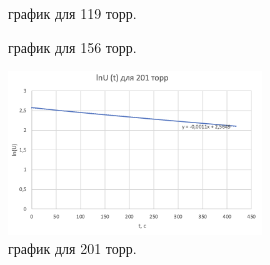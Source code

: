 \documentclass[a4paper,12pt]{article}
\begin{document}
    \begin{figure}[h]
        \begin{minipage}[h]{0.49\linewidth}
        \caption{график для 119 торр.}
        \end{minipage}
        \hfill
        \begin{minipage}[h]{0.49\linewidth}
        \caption{график для 156 торр.}
        \end{minipage}
    \end{figure}

    \begin{figure}[H]
        \centering
        \includegraphics[width=0.6\textwidth]{201.png}
        \caption{график для 201 торр.}
    \end{figure}
\end{document}
